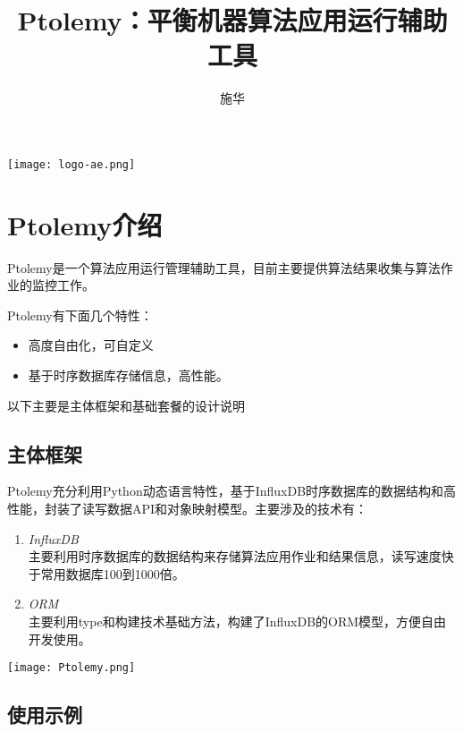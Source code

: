 \documentclass[cn,hazy,blue,14pt,screen]{elegantnote}
\title{Ptolemy：平衡机器算法应用运行辅助工具}
\author{施华}
\institute{Algorithm application operation assistant tool}
\date{\zhtoday}
\begin{document}
\maketitle

\centerline{
  \texttt{[image: logo-ae.png]}
}



\section{Ptolemy介绍}

Ptolemy是一个算法应用运行管理辅助工具，目前主要提供算法结果收集与算法作业的监控工作。

Ptolemy有下面几个特性：

\begin{itemize}
  \item 高度自由化，可自定义
  \item 基于时序数据库存储信息，高性能。
\end{itemize}

以下主要是主体框架和基础套餐的设计说明



\subsection{主体框架}

Ptolemy充分利用Python动态语言特性，基于InfluxDB时序数据库的数据结构和高性能，封装了读写数据API和对象映射模型。主要涉及的技术有：

\begin{enumerate}[label=\arabic*).]
	\item \textit{InfluxDB}\\
	主要利用时序数据库的数据结构来存储算法应用作业和结果信息，读写速度快于常用数据库100到1000倍。
	\item \textit{ORM}\\
	主要利用type和构建技术基础方法，构建了InfluxDB的ORM模型，方便自由开发使用。
\end{enumerate}

\centerline{
	\texttt{[image: Ptolemy.png]}
}








\subsection{使用示例}
\end{document}
